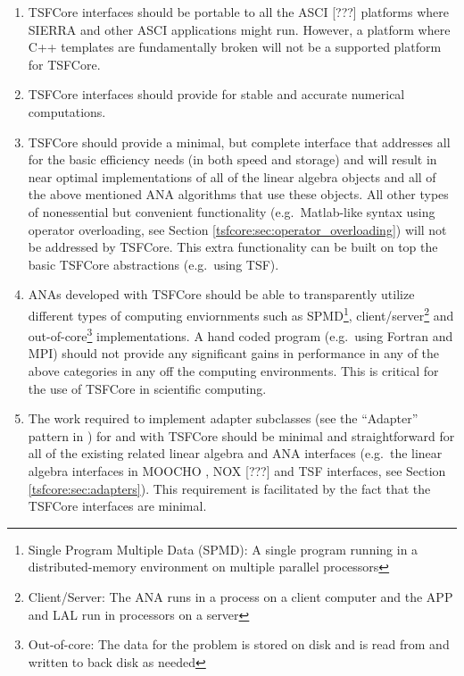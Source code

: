 \documentclass[10pt,fleqn]{article}
\begin{document}
\begin{enumerate}

\item
TSFCore interfaces should be portable to all the ASCI [???]
platforms where SIERRA
\cite{ref:SIERRA} and other ASCI applications might run.  However, a
platform where C++ templates are fundamentally broken will not be a
supported platform for TSFCore.

\item
TSFCore interfaces should provide for stable and accurate numerical
computations.

\item
TSFCore should provide a minimal, but complete interface that
addresses all for the basic efficiency needs (in both speed and
storage) and will result in near optimal implementations of all of the
linear algebra objects and all of the above mentioned ANA algorithms
that use these objects.  All other types of nonessential but
convenient functionality (e.g.~Matlab-like syntax using operator
overloading, see Section \ref{tsfcore:sec:operator_overloading}) will
not be addressed by TSFCore.  This extra functionality can be built on
top the basic TSFCore abstractions (e.g.~using TSF).

\item
ANAs developed with TSFCore should be able to transparently utilize
different types of computing enviornments such as SPMD\footnote{Single
Program Multiple Data (SPMD): A single program running in a
distributed-memory environment on multiple parallel processors},
client/server\footnote{Client/Server: The ANA runs in a process on a
client computer and the APP and LAL run in processors on a server} and
out-of-core\footnote{Out-of-core: The data for the problem is stored
on disk and is read from and written to back disk as needed}
implementations.  A hand coded program (e.g.~using Fortran and MPI)
should not provide any significant gains in performance in any of the
above categories in any off the computing environments.  This is
critical for the use of TSFCore in scientific computing.

\item
The work required to implement adapter subclasses (see the ``Adapter''
pattern in \cite{ref:gama_et_al_1995}) for and with TSFCore should be
minimal and straightforward for all of the existing related linear
algebra and ANA interfaces (e.g.~the linear algebra interfaces in
MOOCHO \cite{ref:moochouserguide}, NOX [???] and TSF interfaces, see
Section \ref{tsfcore:sec:adapters}).  This requirement is facilitated
by the fact that the TSFCore interfaces are minimal.

\end{enumerate}
\end{document}

